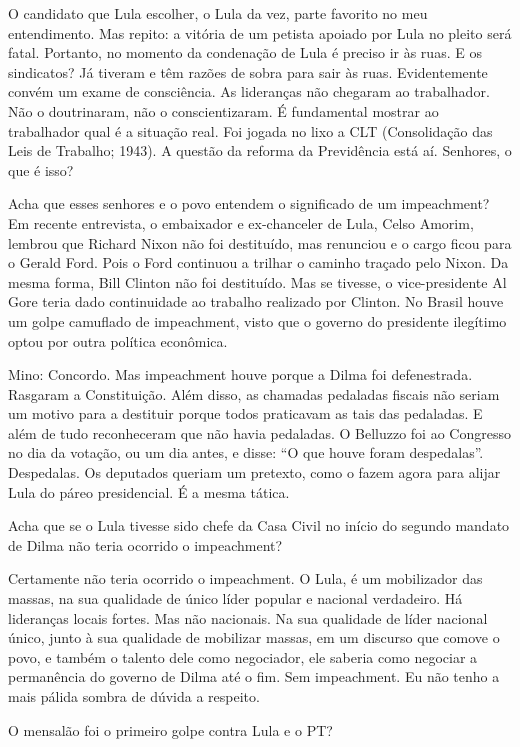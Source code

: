 \falaM O candidato que Lula escolher, o Lula da vez, parte favorito no meu
entendimento. Mas repito: a vitória de um petista apoiado por Lula no
pleito será fatal. Portanto, no momento da condenação de Lula é preciso
ir às ruas. E os sindicatos? Já tiveram e têm razões de sobra para sair
às ruas. Evidentemente convém um exame de consciência. As lideranças não
chegaram ao trabalhador. Não o doutrinaram, não o conscientizaram. É
fundamental mostrar ao trabalhador qual é a situação real. Foi jogada no
lixo a CLT (Consolidação das Leis de Trabalho; 1943). A questão da
reforma da Previdência está aí. Senhores, o que é isso?

\falaG Acha que esses senhores e o povo entendem o significado de um
impeachment? Em recente entrevista, o embaixador e ex-chanceler de Lula,
Celso Amorim, lembrou que Richard Nixon não foi destituído, mas
renunciou e o cargo ficou para o Gerald Ford. Pois o Ford continuou a
trilhar o caminho traçado pelo Nixon. Da mesma forma, Bill Clinton não
foi destituído. Mas se tivesse, o vice-presidente Al Gore teria dado
continuidade ao trabalho realizado por Clinton. No Brasil houve um golpe
camuflado de impeachment, visto que o governo do presidente ilegítimo
optou por outra política econômica.

Mino: Concordo. Mas impeachment houve porque a Dilma foi defenestrada.
Rasgaram a Constituição. Além disso, as chamadas pedaladas fiscais não
seriam um motivo para a destituir porque todos praticavam as tais das
pedaladas. E além de tudo reconheceram que não havia pedaladas. O
Belluzzo foi ao Congresso no dia da votação, ou um dia antes, e disse:
``O que houve foram despedalas''. Despedalas. Os deputados queriam um
pretexto, como o fazem agora para alijar Lula do páreo presidencial. É a
mesma tática.

\falaG Acha que se o Lula tivesse sido chefe da Casa Civil no início do
segundo mandato de Dilma não teria ocorrido o impeachment?

\falaM Certamente não teria ocorrido o impeachment. O Lula, é um mobilizador
das massas, na sua qualidade de único líder popular e nacional
verdadeiro. Há lideranças locais fortes. Mas não nacionais. Na sua
qualidade de líder nacional único, junto à sua qualidade de mobilizar
massas, em um discurso que comove o povo, e também o talento dele como
negociador, ele saberia como negociar a permanência do governo de Dilma
até o fim. Sem impeachment. Eu não tenho a mais pálida sombra de dúvida
a respeito.

\falaG O mensalão foi o primeiro golpe contra Lula e o PT?

